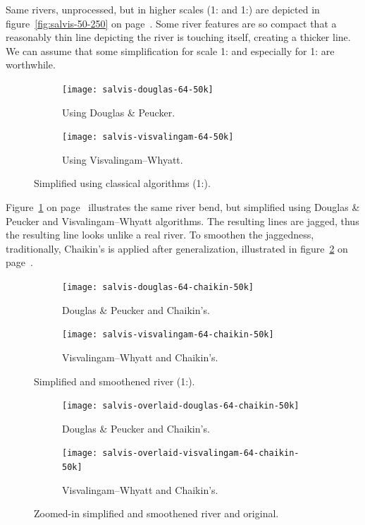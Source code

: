 \documentclass[a4paper]{article}
\newcommand{\onpage}[1]{\ref{#1} on page~\pageref{#1}}
\newcommand{\DP}{Douglas \& Peucker}
\newcommand{\VW}{Visvalingam--Whyatt}
\begin{document}
Same rivers, unprocessed, but in higher scales (1: and
1:) are depicted in figure~\onpage{fig:salvis-50-250}. Some
river features are so compact that a reasonably thin line depicting the river
is touching itself, creating a thicker line. We can assume that some
simplification for scale 1: and especially for
1: are worthwhile.

\begin{figure}[ht]
    \centering
    \begin{subfigure}[b]{.49\textwidth}
        \texttt{[image: salvis-douglas-64-50k]}
        \caption{Using {\DP}.}
    \end{subfigure}
    \hfill
    \begin{subfigure}[b]{.49\textwidth}
        \texttt{[image: salvis-visvalingam-64-50k]}
        \caption{Using {\VW}.}
    \end{subfigure}
    \caption{Simplified using classical algorithms (1:).}
    \label{fig:salvis-generalized-50k}
\end{figure}

Figure~\onpage{fig:salvis-generalized-50k} illustrates the same river bend, but
simplified using {\DP} and {\VW} algorithms. The resulting lines are jagged,
thus the resulting line looks unlike a real river. To smoothen the jaggedness,
traditionally, Chaikin's\cite{chaikin1974algorithm} is applied after
generalization, illustrated in
figure~\onpage{fig:salvis-generalized-chaikin-50k}.


\begin{figure}[ht!]
    \centering
    \begin{subfigure}[b]{.49\textwidth}
        \texttt{[image: salvis-douglas-64-chaikin-50k]}
        \caption{{\DP} and Chaikin's.}
    \end{subfigure}
    \hfill
    \begin{subfigure}[b]{.49\textwidth}
        \texttt{[image: salvis-visvalingam-64-chaikin-50k]}
        \caption{{\VW} and Chaikin's.}
    \end{subfigure}
    \caption{Simplified and smoothened river (1:).}
    \label{fig:salvis-generalized-chaikin-50k}
\end{figure}

\begin{figure}[ht!]
    \centering
    \begin{subfigure}[b]{.49\textwidth}
        \texttt{[image: salvis-overlaid-douglas-64-chaikin-50k]}
        \caption{{\DP} and Chaikin's.}
    \end{subfigure}
    \hfill
    \begin{subfigure}[b]{.49\textwidth}
        \texttt{[image: salvis-overlaid-visvalingam-64-chaikin-50k]}
        \caption{{\VW} and Chaikin's.}
    \end{subfigure}
    \caption{Zoomed-in simplified and smoothened river and original.}
    \label{fig:salvis-overlaid-generalized-chaikin-50k}
\end{figure}
\end{document}
